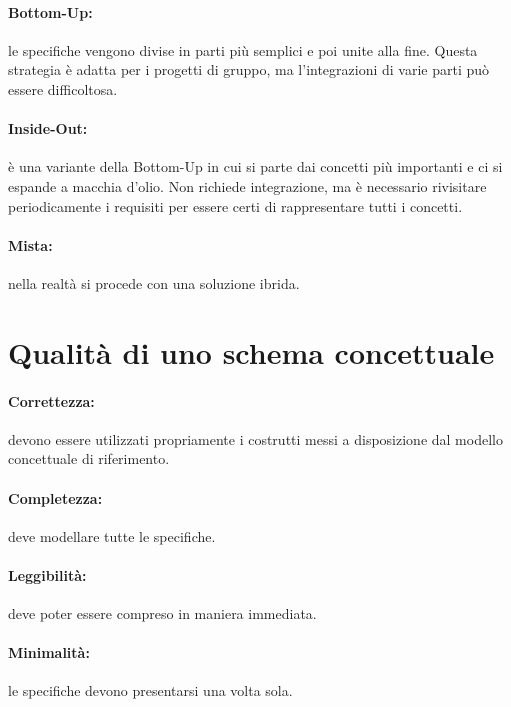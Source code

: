 \paragraph{Bottom-Up:} le specifiche vengono divise in parti più semplici e poi unite alla fine. Questa strategia è adatta per i progetti di gruppo, ma l'integrazioni di varie parti può essere difficoltosa.

\paragraph{Inside-Out:} è una variante della Bottom-Up in cui si parte dai concetti più importanti e ci si espande a macchia d'olio. Non richiede integrazione, ma è necessario rivisitare periodicamente i requisiti per essere certi di rappresentare tutti i concetti.

\paragraph{Mista:} nella realtà si procede con una soluzione ibrida.

\section{Qualità di uno schema concettuale}

\paragraph{Correttezza:} devono essere utilizzati propriamente i costrutti messi a disposizione dal modello concettuale di riferimento.

\paragraph{Completezza:} deve modellare tutte le specifiche.

\paragraph{Leggibilità:} deve poter essere compreso in maniera immediata.

\paragraph{Minimalità:} le specifiche devono presentarsi una volta sola.